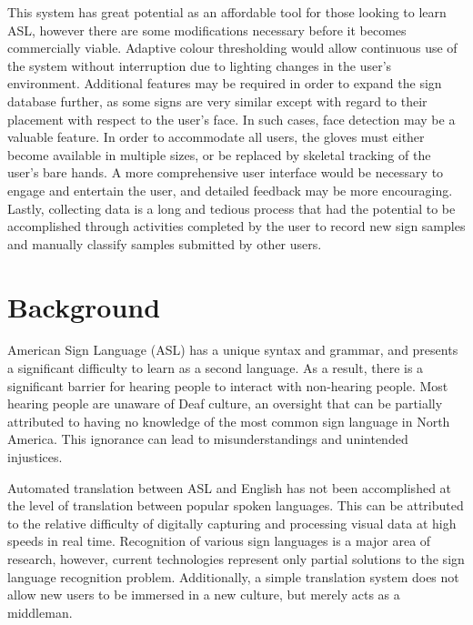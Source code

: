 \documentclass[12pt]{article}
\begin{document}
This system has great potential as an affordable tool for those looking to learn ASL, however there are some modifications necessary before it becomes commercially viable. Adaptive colour thresholding would allow continuous use of the system without interruption due to lighting changes in the user’s environment. Additional features may be required in order to expand the sign database further, as some signs are very similar except with regard to their placement with respect to the user’s face. In such cases, face detection may be a valuable feature. In order to accommodate all users, the gloves must either become available in multiple sizes, or be replaced by skeletal tracking of the user’s bare hands. A more comprehensive user interface would be necessary to engage and entertain the user, and detailed feedback may be more encouraging. Lastly, collecting data is a long and tedious process that had the potential to be accomplished through activities completed by the user to record new sign samples and manually classify samples submitted by other users. 


\newpage

\onehalfspacing
\tableofcontents
\newpage
\doublespacing
{}
\listoftables
{}
\listoffigures
\newpage

\section{Background}
American Sign Language (ASL) has a unique syntax and grammar, and presents a significant difficulty to learn as a second language. As a result, there is a significant barrier for hearing people to interact with non-hearing people. Most hearing people are unaware of Deaf culture, an oversight that can be partially attributed to having no knowledge of the most common sign language in North America. This ignorance can lead to misunderstandings and unintended injustices.

Automated translation between ASL and English has not been accomplished at the level of translation between popular spoken languages. This can be attributed to the relative difficulty of digitally capturing and processing visual data at high speeds in real time. Recognition of various sign languages is a major area of research, however, current technologies represent only partial solutions to the sign language recognition problem. Additionally, a simple translation system does not allow new users to be immersed in a new culture, but merely acts as a middleman. 
\end{document}
